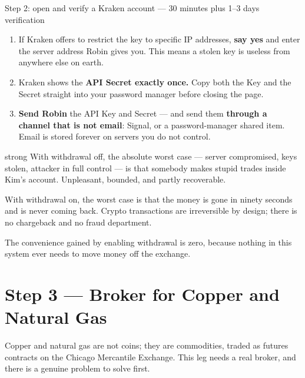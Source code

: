 \documentclass[11pt,a4paper]{article}
\begin{document}
\begin{kimbox}{Step 2: open and verify a Kraken account --- 30 minutes plus 1--3 days verification}
\begin{enumerate}[leftmargin=1.6em, itemsep=3pt]
          \vspace{0.4em}
    \item If Kraken offers to restrict the key to specific IP
          addresses, \textbf{say yes} and enter the server address
          Robin gives you. This means a stolen key is useless from
          anywhere else on earth.
    \item Kraken shows the \textbf{API Secret exactly once.} Copy both
          the Key and the Secret straight into your password manager
          before closing the page.
    \item \textbf{Send Robin} the API Key and Secret --- and send them
          \textbf{through a channel that is not email}: Signal, or a
          password-manager shared item. Email is stored forever on
          servers you do not control.
\end{enumerate}
\end{kimbox}

\begin{resultbox}{strong}
With withdrawal off, the absolute worst case --- server compromised,
keys stolen, attacker in full control --- is that somebody makes
stupid trades inside Kim's account. Unpleasant, bounded, and partly
recoverable.

With withdrawal on, the worst case is that the money is gone in
ninety seconds and is never coming back. Crypto transactions are
irreversible by design; there is no chargeback and no fraud
department.

The convenience gained by enabling withdrawal is zero, because
nothing in this system ever needs to move money off the exchange.
\end{resultbox}

\section{Step 3 --- Broker for Copper and Natural Gas}
\label{sec:broker}

Copper and natural gas are not coins; they are commodities, traded as
futures contracts on the Chicago Mercantile Exchange. This leg needs a
real broker, and there is a genuine problem to solve first.
\end{document}
